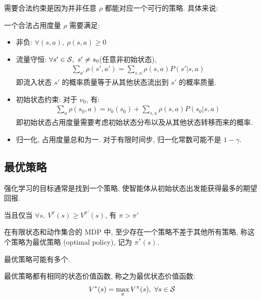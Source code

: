 需要合法约束是因为并非任意 $\rho$ 都能对应一个可行的策略. 具体来说:
\begin{definition}[合法占用度量]
    一个合法占用度量 $\rho$ 需要满足:
    \begin{itemize}
        \item 非负: $\forall (s,a),\ \rho(s,a)\ge 0$
        \item 流量守恒: $\forall s'\in\mathcal{S},\ s'\ne s_0$(任意非初始状态),
        \begin{align*}
            \sum_{a'}\rho(s',a')=\sum_{s,a}\rho(s,a)P(s'|s,a)
        \end{align*}
        即流入状态 $s'$ 的概率质量等于从其他状态流出到 $s'$ 的概率质量. 
        \item 初始状态约束: 对于 $\nu_0$, 有:
        \begin{align*}
            \sum_a\rho(s_0,a)=\nu_0(s_0)+\sum_{s,a}\rho(s,a)P(s_0|s,a)
        \end{align*}
        即初始状态占用度量需要考虑初始状态分布以及从其他状态转移而来的概率. 
        \item 归一化, 占用度量总和为一. 对于有限时间步, 归一化常数可能不是 $1-\gamma$.
    \end{itemize}
\end{definition}

\subsection{最优策略}
强化学习的目标通常是找到一个策略, 使智能体从初始状态出发能获得最多的期望回报. 

\begin{definition}
    当且仅当 $\forall s,\ V^\pi(s)\ge V^{\pi'}(s)$, 有 $\pi > \pi'$
\end{definition}

\begin{theorem}
    在有限状态和动作集合的 MDP 中, 至少存在一个策略不差于其他所有策略, 称这个策略为最优策略 (optimal policy), 记为 $\pi^*(s)$.
\end{theorem}

最优策略可能有多个. 

\begin{definition}[最优状态价值函数]
    最优策略都有相同的状态价值函数, 称之为最优状态价值函数:
    \begin{align*}
        V^*(s)=\max_\pi V^\pi(s),\ \forall s\in\mathcal{S}
    \end{align*}
\end{definition}

